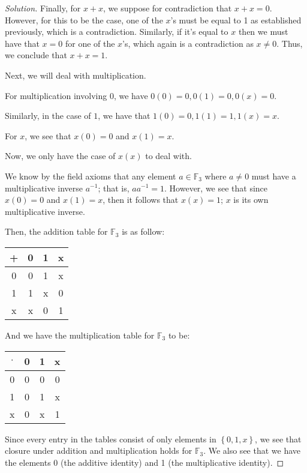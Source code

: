 \documentclass{article}
\newenvironment{solution}{\begin{proof}[Solution]}{\end{proof}}
\begin{document}
\begin{solution}
	Finally, for $x + x$, we suppose for contradiction that $x + x = 0$. However, for this to be the case, one of the $x$'s must be equal to 1 as established previously, which is a contradiction. Similarly, if it's equal to $x$ then we must have that $x = 0$ for one of the $x$'s, which again is a contradiction as $x \not = 0$. Thus, we conclude that $x + x = 1$. 
	
	Next, we will deal with multiplication. 
	
	For multiplication involving $0$, we have $0(0) = 0, 0(1) = 0, 0(x) = 0$.
	
	Similarly, in the case of $1$, we have that $1(0) = 0, 1(1) = 1, 1(x) = x$.
	
	For $x$, we see that $x(0) = 0$ and $x(1) = x$. 
	
	Now, we only have the case of $x(x)$ to deal with.
	
	We know by the field axioms that any element $a \in \mathbb{F}_{3}$ where $a \not= 0$ must have a multiplicative inverse $a^{-1}$; that is, $aa^{-1} = 1$. However, we see that since $x(0) = 0$ and $x(1) = x$, then it follows that $x(x) = 1$; $x$ is its own multiplicative inverse.
	
	Then, the addition table for $\mathbb{F}_{3}$ is as follow:
	\begin{center}
		\begin{tabular}{c|c c c}
			+ & 0 & 1 & x \\
			\hline
			0 & 0 & 1 & x \\
			1 & 1 & x & 0 \\
			x & x & 0 & 1
		\end{tabular}
	\end{center}

	And we have the multiplication table for $\mathbb{F}_{3}$ to be:
	\begin{center}
		\begin{tabular}{c|c c c}
			$\cdot$ & 0 & 1 & x \\
			\hline
			0 & 0 & 0 & 0 \\
			1 & 0 & 1 & x \\
			x & 0 & x & 1
		\end{tabular}
	\end{center}

	Since every entry in the tables consist of only elements in $\left\{  0, 1, x\right\}$, we see that closure under addition and multiplication holds for $\mathbb{F}_{3}$. We also see that we have the elements 0 (the additive identity) and 1 (the multiplicative identity).


\end{solution}
\end{document}
